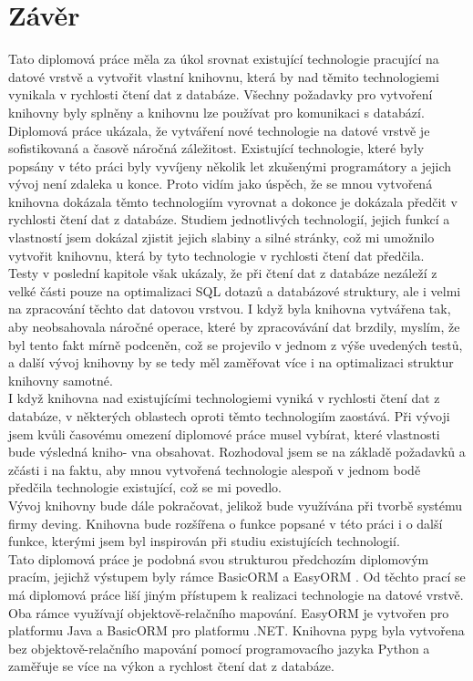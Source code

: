 \documentclass[ing,male,java,dept456]{diploma}						%
\begin{document}
\section{Závěr}
\label{sec:Conclusion}
Tato diplomová práce měla za úkol srovnat existující technologie pracující na datové vrstvě a vytvořit vlastní knihovnu, která by nad těmito technologiemi vynikala v rychlosti čtení dat z databáze. Všechny požadavky pro vytvoření knihovny byly splněny a knihovnu lze používat pro komunikaci s databází. \\
Diplomová práce ukázala, že vytváření nové technologie na datové vrstvě je sofistikovaná a časově náročná záležitost. Existující technologie, které byly popsány v této práci byly vyvíjeny několik let zkušenými programátory a jejich vývoj není zdaleka u konce. Proto vidím jako úspěch, že se mnou vytvořená knihovna dokázala těmto technologiím vyrovnat a dokonce je dokázala předčit v rychlosti čtení dat z databáze. Studiem jednotlivých technologií, jejich funkcí a vlastností jsem dokázal zjistit jejich slabiny a silné stránky, což mi umožnilo vytvořit knihovnu, která by tyto technologie v rychlosti čtení dat předčila. \\
Testy v poslední kapitole však ukázaly, že při čtení dat z databáze nezáleží z velké části pouze na optimalizaci SQL dotazů a databázové struktury, ale i velmi na zpracování těchto dat datovou vrstvou. I když byla knihovna vytvářena tak, aby neobsahovala náročné operace, které by zpracovávání dat brzdily, myslím, že byl tento fakt mírně podceněn, což se projevilo v jednom z výše uvedených testů, a další vývoj knihovny by se tedy měl zaměřovat více i na optimalizaci struktur knihovny samotné. \\
I když knihovna nad existujícími technologiemi vyniká v rychlosti čtení dat z databáze, v některých oblastech oproti těmto technologiím zaostává. Při vývoji jsem kvůli časovému omezení diplomové práce musel vybírat, které vlastnosti bude výsledná kniho- vna obsahovat. Rozhodoval jsem se na základě požadavků a zčásti i na faktu, aby mnou vytvořená technologie alespoň v jednom bodě předčila technologie existující, což se mi povedlo. \\
Vývoj knihovny bude dále pokračovat, jelikož bude využívána při tvorbě systému firmy deving. Knihovna bude rozšířena o funkce popsané v této práci i o další funkce, kterými jsem byl inspirován při studiu existujících technologií. \\
Tato diplomová práce je podobná svou strukturou předchozím diplomovým pracím, jejichž výstupem byly rámce BasicORM \cite{BasicORM} a EasyORM \cite{EasyORM}. Od těchto prací se má diplomová práce liší jiným přístupem k realizaci technologie na datové vrstvě. Oba rámce využívají objektově-relačního mapování. EasyORM je vytvořen pro platformu Java a BasicORM pro platformu .NET. Knihovna pypg byla vytvořena bez objektově-relačního mapování pomocí programovacího jazyka Python a zaměřuje se více na výkon a rychlost čtení dat z databáze.
\end{document}
